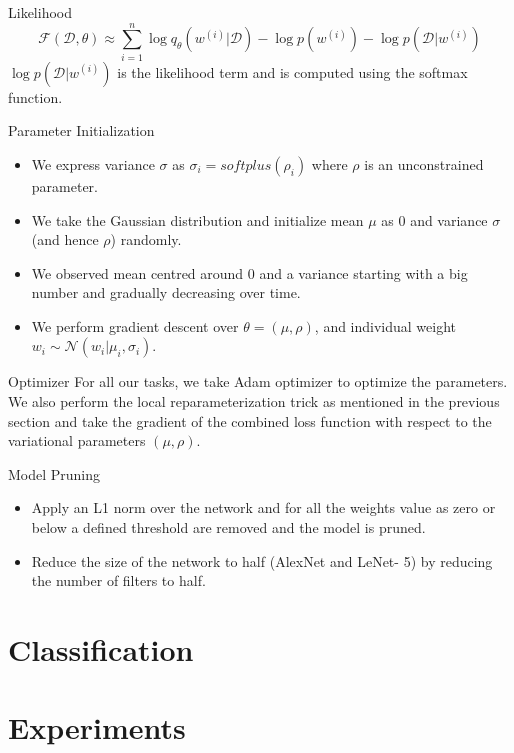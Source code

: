 \documentclass{beamer}
\begin{document}
\begin{frame}{Likelihood}
  \[
    \mathcal{F}(\mathcal{D}, \theta) \approx \sum_{i = 1}^n \log q_\theta(w^{(i)}|\mathcal{D}) - \log p(w^{(i)}) - \log p(\mathcal{D}|w^{(i)})
  \]
  $\log p(\mathcal{D}|w^{(i)})$ is the likelihood term and is computed using the softmax function.  
\end{frame}
\begin{frame}{Parameter Initialization}
  \begin{itemize}
    \item We express variance $\sigma$ as $\sigma_i = \textit{softplus}(\rho_i)$ where $\rho$ is an unconstrained parameter.
    \item We take the Gaussian distribution and initialize mean $\mu$ as 0 and variance $\sigma$ (and hence $\rho$) randomly. 
    \item We observed mean centred around 0 and a variance starting with a big number and gradually decreasing over time.
    \item We perform gradient descent over $\theta = (\mu, \rho)$, and individual weight $w_i \sim \mathcal{N}(w_i|\mu_i, \sigma_i)$.
  \end{itemize}
\end{frame}
\begin{frame}{Optimizer}
  For all our tasks, we take Adam optimizer to optimize the parameters. We also perform
  the local reparameterization trick as mentioned in the previous section and take the gradient
  of the combined loss function with respect to the variational parameters $(\mu, \rho)$.
\end{frame}
\begin{frame}{Model Pruning}
  \begin{itemize}
    \item Apply an L1 norm over the network and for all the weights value as zero or below a defined threshold are removed and the model is pruned.
    \item Reduce the size of the network to half (AlexNet and LeNet- 5) by reducing the number of filters to half.
  \end{itemize}
\end{frame}

\section{Classification}

\section{Experiments}

\end{document}

